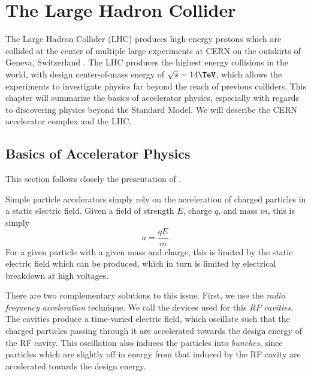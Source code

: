 

\chapter[The Large Hadron Collider][Top of Page Title]{The Large Hadron Collider}

The Large Hadron Collider (LHC) produces high-energy protons which are collided at the center of multiple large experiments at CERN on the outskirts of Geneva, Switzerland \cite{Evans:2008zzb}.
The LHC produces the highest energy collisions in the world, with design center-of-mass energy of $\sqrt{s} = 14 \TeV$, which allows the experiments to investigate physics far beyond the reach of previous colliders.
This chapter will summarize the basics of accelerator physics, especially with regards to discovering physics beyond the Standard Model.
We will describe the CERN accelerator complex and the LHC.

\section{Basics of Accelerator Physics}

This section follows closely the presentation of \cite{ShiltsevColliderLectures}.

Simple particle accelerators simply rely on the acceleration of charged particles in a static electric field.
Given a field of strength $E$, charge $q$, and mass $m$, this is simply
\begin{equation}
a = \frac{qE}{m}.
\end{equation}
For a given particle with a given mass and charge, this is limited by the static electric field which can be produced, which in turn is limited by electrical breakdown at high voltages.

There are two complementary solutions to this issue.
First, we use the \textit{radio frequency acceleration} technique.
We call the devices used for this \textit{RF cavities}.
The cavities produce a time-varied electric field, which oscillate such that the charged particles passing through it are accelerated towards the design energy of the RF cavity.
This oscillation also induces the particles into \textit{bunches}, since particles which are slightly off in energy from that induced by the RF cavity are accelerated towards the design energy.

